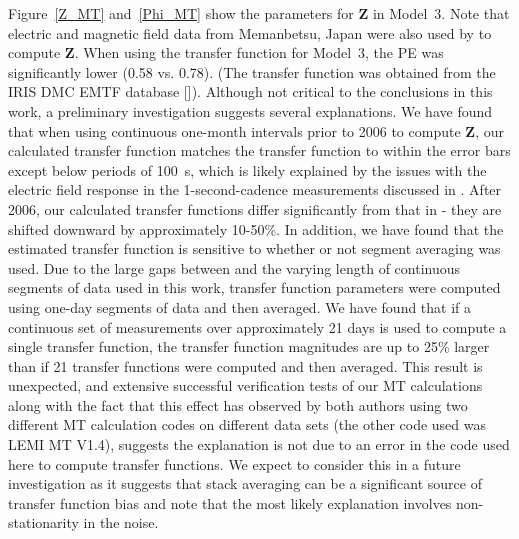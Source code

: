 \documentclass[draft,linenumbers]{agujournal2018}
\begin{document}

Figure~\ref{Z_MT} and~\ref{Phi_MT} show the parameters for $\mathbf{Z}$ in Model~3. Note that electric and magnetic field data from Memanbetsu, Japan were also used by \cite{Fujii2015} to compute $\mathbf{Z}$. When using the \cite{Fujii2015} transfer function for Model~3, the PE was significantly lower (0.58 vs. 0.78). (The \cite{Fujii2015} transfer function was obtained from the IRIS DMC EMTF database [\cite{Kelbert2011}]). Although not critical to the conclusions in this work, a preliminary investigation suggests several explanations. We have found that when using continuous one-month intervals prior to 2006 to compute $\mathbf{Z}$, our calculated transfer function matches the \cite{Fujii2015} transfer function to within the error bars except below periods of 100~s, which is likely explained by the issues with the electric field response in the 1-second-cadence measurements discussed in \cite{Fujii2015}. After 2006, our calculated transfer functions differ significantly from that in \cite{Fujii2015} - they are shifted downward by approximately 10-50\%. In addition, we have found that the estimated transfer function is sensitive to whether or not segment averaging was used. Due to the large gaps between and the varying length of continuous segments of data used in this work, transfer function parameters were computed using one-day segments of data and then averaged. We have found that if a continuous set of measurements over approximately 21 days is used to compute a single transfer function, the transfer function magnitudes are up to 25\% larger than if 21 transfer functions were computed and then averaged. This result is unexpected, and extensive successful verification tests of our MT calculations along with the fact that this effect has observed by both authors using two different MT calculation codes on different data sets (the other code used was LEMI MT V1.4), suggests the explanation is not due to an error in the code used here to compute transfer functions. We expect to consider this in a future investigation as it suggests that stack averaging can be a significant source of transfer function bias and note that the most likely explanation involves non-stationarity in the noise.
\end{document}
